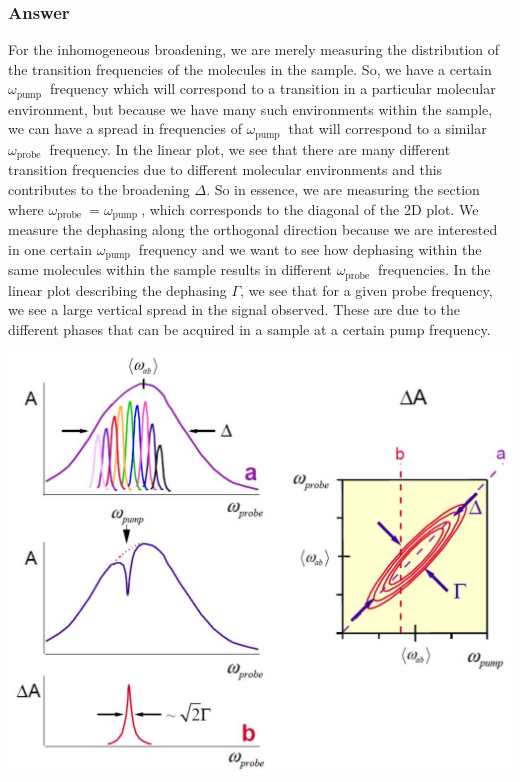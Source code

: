 \documentclass[12pt]{article}
\begin{document}
\subsubsection{Answer}
For the inhomogeneous broadening, we are merely measuring the distribution of the transition frequencies of the molecules in the sample. So, we have a certain $\omega_{\text {pump }}$ frequency which will correspond to a transition in a particular molecular environment, but because we have many such environments within the sample, we can have a spread in frequencies of $\omega_{\text {pump }}$ that will correspond to a similar $\omega_{\text {probe }}$ frequency. In the linear plot, we see that there are many different transition frequencies due to different molecular environments and this contributes to the broadening $\Delta$. So in essence, we are measuring the section where $\omega_{\text {probe }} = \omega_{\text {pump }}$, which corresponds to the diagonal of the 2D plot. We measure the dephasing along the orthogonal direction because we are interested in one certain $\omega_{\text {pump }}$ frequency and we want to see how dephasing within the same molecules within the sample results in different $\omega_{\text {probe }}$ frequencies. In the linear plot describing the dephasing $\Gamma $, we see that for a given probe frequency, we see a large vertical spread in the signal observed. These are due to the different phases that can be acquired in a sample at a certain pump frequency.



\includegraphics[max width=\textwidth, center]{2024_05_26_dcc5d1010257c1c9dfb7g-2}\\
\end{document}
